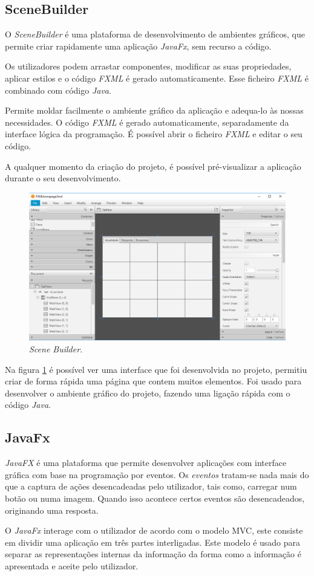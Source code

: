 \subsection{SceneBuilder}
O \emph{SceneBuilder} é uma plataforma de desenvolvimento de ambientes gráficos, que permite criar rapidamente uma aplicação \emph{JavaFx}, sem recurso a código.\par 
Os utilizadores podem arrastar componentes, modificar as suas propriedades, aplicar estilos e o código \emph{FXML} é gerado automaticamente. Esse ficheiro \emph{FXML} é combinado com código \emph{Java}.\par
Permite moldar facilmente o ambiente gráfico da aplicação e adequa-lo às nossas necessidades. O código \emph{FXML} é gerado automaticamente, separadamente da interface lógica da programação. É possível abrir o ficheiro \emph{FXML} e editar o seu código.\par
A qualquer momento da criação do projeto, é possível pré-visualizar a aplicação durante o seu desenvolvimento.

\vspace{0,07cm}
\begin{figure}[H]
\centering
\includegraphics[scale=0.4]{imagens/scene_builder.PNG}
\caption{\emph{Scene Builder}.}
\label{fig:scenebuilder}
\end{figure}
Na figura \ref{fig:scenebuilder} é possível ver uma interface que foi desenvolvida no projeto, permitiu criar de forma rápida uma página que contem muitos elementos.
Foi usado para desenvolver o ambiente gráfico do projeto, fazendo uma ligação rápida com o código \emph{Java}.

\subsection{JavaFx}
\emph{JavaFX} é uma plataforma que permite desenvolver aplicações com interface gráfica com base na programação por eventos. Os \emph{eventos} tratam-se nada mais do que a captura de ações desencadeadas pelo utilizador, tais como, carregar num botão ou numa imagem. Quando isso acontece certos eventos são desencadeados, originando uma resposta. \par
O \emph{JavaFx} interage com o utilizador de acordo com o modelo \ac{MVC}, este consiste em dividir uma aplicação em três partes interligadas. Este modelo é usado para separar as representações internas da informação da forma como a informação é apresentada e aceite pelo utilizador.

